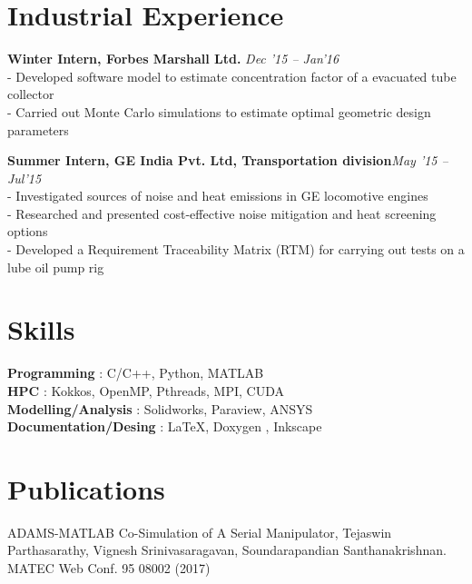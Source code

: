 \documentclass[margin,line]{res}
\begin{document}
\begin{resume}
\section {\sc Industrial Experience}
\textbullet\hspace{0.005cm} {\bf Winter Intern, Forbes Marshall Ltd. }\hfill {\em Dec '15 -- Jan'16}\\
- Developed software model to estimate concentration factor of a evacuated tube collector\\ 
- Carried out Monte Carlo simulations to estimate optimal geometric design parameters

\textbullet\hspace{0.005cm} {\bf Summer Intern, GE India Pvt. Ltd, Transportation division}\hfill {\em May '15 -- Jul'15}\\
- Investigated sources of noise and heat emissions in GE locomotive engines\\
- Researched and presented cost-effective noise mitigation and heat screening options \\
- Developed a Requirement Traceability Matrix (RTM) for carrying out tests on a lube oil pump rig

\section {\sc Skills}
\textbullet\hspace{0.005cm} {\bf Programming} : C/C++, Python, MATLAB \\
\textbullet\hspace{0.005cm} {\bf HPC} : Kokkos, OpenMP, Pthreads, MPI, CUDA\\
\textbullet\hspace{0.005cm} {\bf Modelling/Analysis} : Solidworks, Paraview, ANSYS\\
\textbullet\hspace{0.005cm} {\bf Documentation/Desing} : \LaTeX, Doxygen , Inkscape 

\section {\sc Publications}
\textbullet\hspace{0.005cm} ADAMS-MATLAB Co-Simulation of A Serial Manipulator, Tejaswin  Parthasarathy, Vignesh Srinivasaragavan, Soundarapandian  Santhanakrishnan. MATEC Web Conf. 95 08002 (2017) 
\end{resume}
\end{document}
